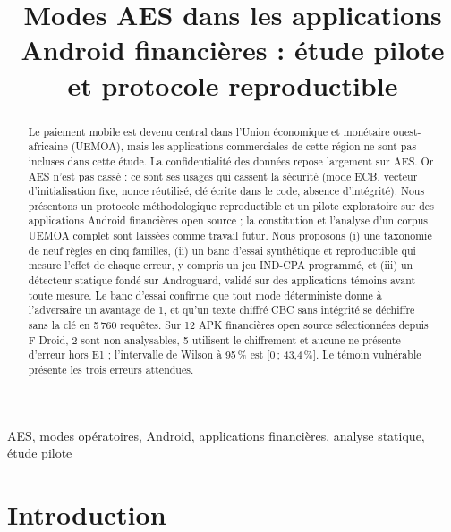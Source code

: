 \documentclass[conference,a4paper]{IEEEtran}
\begin{document}
\title{Modes AES dans les applications Android financières : étude pilote et protocole reproductible}

\author{
}

\maketitle

\begin{abstract}
Le paiement mobile est devenu central dans l'Union économique et monétaire ouest-africaine (UEMOA), mais les applications commerciales de cette région ne sont pas incluses dans cette étude. La confidentialité des données repose largement sur AES. Or AES n'est pas cassé : ce sont ses usages qui cassent la sécurité (mode ECB, vecteur d'initialisation fixe, nonce réutilisé, clé écrite dans le code, absence d'intégrité). Nous présentons un protocole méthodologique reproductible et un pilote exploratoire sur des applications Android financières open source ; la constitution et l'analyse d'un corpus UEMOA complet sont laissées comme travail futur. Nous proposons (i) une taxonomie de neuf règles en cinq familles, (ii) un banc d'essai synthétique et reproductible qui mesure l'effet de chaque erreur, y compris un jeu IND-CPA programmé, et (iii) un détecteur statique fondé sur Androguard, validé sur des applications témoins avant toute mesure. Le banc d'essai confirme que tout mode déterministe donne à l'adversaire un avantage de 1, et qu'un texte chiffré CBC sans intégrité se déchiffre sans la clé en 5\,760 requêtes. Sur 12 APK financières open source sélectionnées depuis F-Droid, 2 sont non analysables, 5 utilisent le chiffrement et aucune ne présente d'erreur hors E1 ; l'intervalle de Wilson à 95\,\% est [0\,; 43,4\,\%]. Le témoin vulnérable présente les trois erreurs attendues.
\end{abstract}

\begin{IEEEkeywords}
AES, modes opératoires, Android, applications financières, analyse statique, étude pilote
\end{IEEEkeywords}

\section{Introduction}
\end{document}
